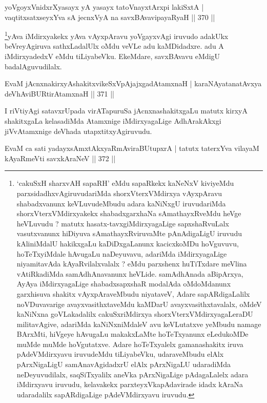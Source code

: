 \begin{shl}
yoVgoyxVnidxrXyasayx yA yasayx tatoV\s nayxtArxpi lakiSxtA |
vaqtitxsatxseyxYva sA jecnxVyA na savxBAvavipayaRyaH \hfill || 370 ||
\end{shl}

\begin{artha}
\footnote[1]{`cakuSxH sharxvAH sapaRH' eMdu sapaRkekx kaNeNxV kiviyeMdu parxsidadhxvAgiruvudariMda shorxVterxVMdirxya vAyxpAravu shabadxvanunx keVLuvudeMbudu adara kaNiNxgU iruvudariMda shorxVterxVMdirxyakekx shabadxgarxhaNa sAmathayxRveMdu heVge heVLuvudu ? matutx hasatx-tavxgiMdirxyagaLige sapxshaRvuLalx vasutxvanunx hiDiyuva sAmathayxRviruvaMte pAnAdigaLigU iruvudu kAliniMdalU hakikxgaLu kaDiDxgaLanunx kacicxkoMDu hoVguvuvu, hoTeTxyiMdale hAvugaLu naDeyuvavu, adariMda iMdirxyagaLige niyamitavAda kAyaRvilalxvalalx ? eMdu parxshenx huTiTxdare meVlina vAtiRkadiMda samAdhAnavanunx heVLide. samAdhAnada aBipArxya, AyAya iMdirxyagaLige shabadxsapxshaR modalAda oMdoMdanunx garxhisuva shakitx vAyxpAraveMbudu niyataveV, Adare sapARdigaLalilx noVDuvavarige avayxvasithxtaveMdu kaMDarU avayxvasithxtavalalx, oMdeV kaNiNxna goVLakadalilx cakuSxriMdirxya shorxVterxVMdirxyagaLeraDU militavAgive, adariMda kaNiNxniMdaleV avu keVLutatxve yeMbudu namage BArxMti, hiVgeye hAvugaLu makakxLaMte hoTeTxyanunx eLedukoMDe muMde muMde hoVgutatxve. Adare hoTeTxyalelx gamanashakitx iruva pAdeVMdirxyavu iruvudeMdu tiLiyabeVku, udaraveMbudu elAlx pArxNigaLigU samAnavAgidadxrU elAlx pArxNigaLU udaradiMda neDeyuvudilalx, saqSiTxyalilx aneVka pArxNigaLige pAdagaLalelx adara iMdirxyavu iruvudu, kelavakekx parxteyxVkapAdavirade idadx kAraNa udaradalilx sapARdigaLige pAdeVMdirxyavu iruvudu.}yAva iMdirxyakekx yAva vAyxpAravu yoVgayxvAgi iruvudo adakUkx beVreyAgiruva sathxLadalUlx oMdu veVLe adu kaMDidadxre. adu A iMdirxyadedxV eMdu tiLiyabeVku. EkeMdare, savxBAvavu eMdigU badalAguvudilalx.
\end{artha}

\begin{shl}
EvaM jAcnxnakirxyAshakitxvikeSxVpAjajxgadAtamxnaH |
karaNAyatanatAvxya deVhAviBURtirAtamxnaH \hfill || 371 ||
\end{shl}

\begin{artha}
I riVtiyAgi satavxrUpada virATapuruSa jAcnxnashakitxgaLu matutx kirxyA shakitxgaLa kelasadiMda Atamxnige iMdirxyagaLige AdhArakAkxgi jiVvAtamxnige deVhada utapxtitxyAgiruvudu.
\end{artha}

\begin{shl}
EvaM ca sati yadayxsAmxtAkxyaRmAviraBUtupxrA |
tatutx taterxYva vilayaM kAyaRmeVti savxkAraNeV \hfill || 372 ||
\end{shl}

